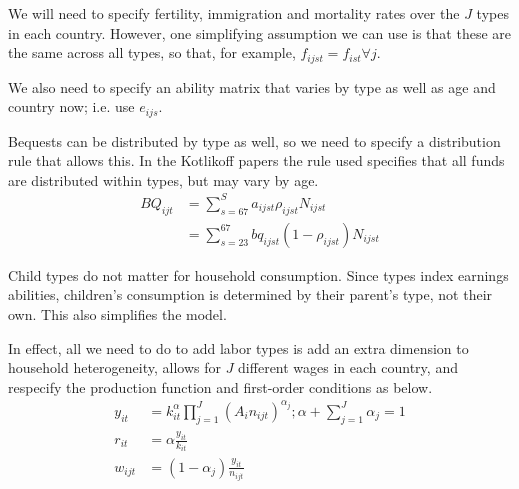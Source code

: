 \documentclass[letterpaper,12pt]{article}
\theoremstyle{definition}
\numberwithin{equation}{section}
\begin{document}
\begin{spacing}{1.5}
	We will need to specify fertility, immigration and mortality rates over the $J$ types in each country.  However, one simplifying assumption we can use is that these are the same across all types, so that, for example, $f_{ijst} = f_{ist} \forall j$.

	We also need to specify an ability matrix that varies by type as well as age and country now; i.e. use $e_{ijs}$.

	Bequests can be distributed by type as well, so we need to specify a distribution rule that allows this.  In the Kotlikoff papers the rule used specifies that all funds are distributed within types, but may vary by age.
	\begin{align}
		BQ_{ijt} & = \sum_{s=67}^S a_{ijst} \rho_{ijst} N_{ijst} \\
		& = \sum_{s=23}^{67} bq_{ijst} (1-\rho_{ijst}) N_{ijst}
	\end{align}

	Child types do not matter for household consumption.  Since types index earnings abilities, children's consumption is determined by their parent's type, not their own.  This also simplifies the model.

	In effect, all we need to do to add labor types is add an extra dimension to household heterogeneity, allows for $J$ different wages in each country, and respecify the production function and first-order conditions as below.
	\begin{align}
		y_{it} & = k_{it}^\alpha \prod_{j=1}^J \left( A_{i} n_{ijt} \right)^{\alpha_j}; \alpha + \sum_{j=1}^J \alpha_j = 1 \\
		r_{it} & = \alpha \frac{y_{it}}{k_{it}} \\
		w_{ijt} & = (1-\alpha_j) \frac{y_{it}}{n_{ijt}}
	\end{align}


\end{spacing}
\end{document}
